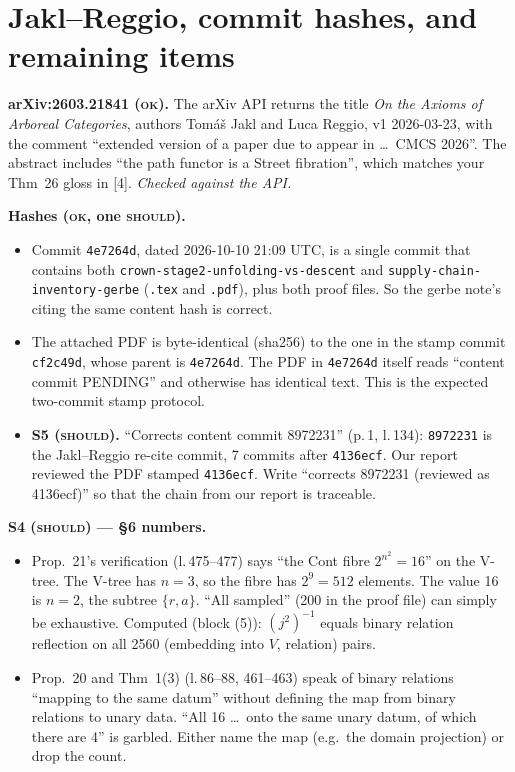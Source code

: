 \documentclass[11pt]{article}
\newcommand{\iss}[1]{\textsc{#1}}
\begin{document}
\section{Jakl--Reggio, commit hashes, and remaining items}
\textbf{arXiv:2603.21841 (\iss{ok}).} The arXiv API returns the title \emph{On the Axioms of Arboreal
Categories}, authors Tom\'a\v{s} Jakl and Luca Reggio, v1 2026-03-23, with the comment ``extended
version of a paper due to appear in \dots\ CMCS 2026''. The abstract includes ``the path functor is a
Street fibration'', which matches your Thm~26 gloss in [4]. \emph{Checked against the API.}

\textbf{Hashes (\iss{ok}, one \iss{should}).}
\begin{itemize}[leftmargin=*]
\item Commit \texttt{4e7264d}, dated 2026-10-10 21:09 UTC, is a single commit that contains both
\texttt{crown-stage2-unfolding-vs-descent} and \texttt{supply-chain-inventory-gerbe} (\texttt{.tex} and
\texttt{.pdf}), plus both proof files. So the gerbe note's citing the same content hash is correct.
\item The attached PDF is byte-identical (sha256) to the one in the stamp commit \texttt{cf2c49d},
whose parent is \texttt{4e7264d}. The PDF in \texttt{4e7264d} itself reads ``content commit
PENDING'' and otherwise has identical text. This is the expected two-commit stamp protocol.
\item \textbf{S5 (\iss{should}).} ``Corrects content commit 8972231'' (p.\,1, l.\,134): \texttt{8972231}
is the Jakl--Reggio re-cite commit, 7 commits after \texttt{4136ecf}. Our report reviewed the PDF
stamped \texttt{4136ecf}. Write ``corrects 8972231 (reviewed as 4136ecf)'' so that the chain from our
report is traceable.
\end{itemize}

\textbf{S4 (\iss{should}) --- \S6 numbers.}
\begin{itemize}[leftmargin=*]
\item Prop.~21's verification (l.\,475--477) says ``the Cont fibre $2^{n^2}=16$'' on the V-tree. The
V-tree has $n=3$, so the fibre has $2^9=512$ elements. The value 16 is $n=2$, the subtree $\{r,a\}$.
``All sampled'' (200 in the proof file) can simply be exhaustive. Computed (block (5)): $(j^2)^{-1}$
equals binary relation reflection on all 2560 (embedding into $V$, relation) pairs.
\item Prop.~20 and Thm~1(3) (l.\,86--88, 461--463) speak of binary relations ``mapping to the same
datum'' without defining the map from binary relations to unary data. ``All 16 \dots\ onto the same
unary datum, of which there are 4'' is garbled. Either name the map (e.g.\ the domain projection) or
drop the count.
\end{itemize}
\end{document}

